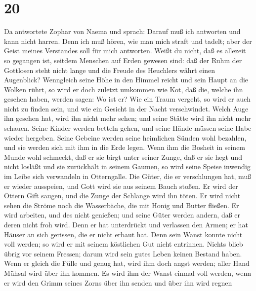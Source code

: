 \hypertarget{section-19}{%
\section{20}\label{section-19}}

 Da antwortete Zophar von Naema und sprach: 
Darauf muß ich antworten und kann nicht harren.  Denn ich
muß hören, wie man mich straft und tadelt; aber der Geist meines
Verstandes soll für mich antworten.  Weißt du nicht, daß es
allezeit so gegangen ist, seitdem Menschen auf Erden gewesen sind:
 daß der Ruhm der Gottlosen steht nicht lange und die Freude
des Heuchlers währt einen Augenblick?  Wenngleich seine Höhe
in den Himmel reicht und sein Haupt an die Wolken rührt,  so
wird er doch zuletzt umkommen wie Kot, daß die, welche ihn gesehen
haben, werden sagen: Wo ist er?  Wie ein Traum vergeht, so
wird er auch nicht zu finden sein, und wie ein Gesicht in der Nacht
verschwindet.  Welch Auge ihn gesehen hat, wird ihn nicht
mehr sehen; und seine Stätte wird ihn nicht mehr schauen. 
Seine Kinder werden betteln gehen, und seine Hände müssen seine Habe
wieder hergeben.  Seine Gebeine werden seine heimlichen
Sünden wohl bezahlen, und sie werden sich mit ihm in die Erde legen.
 Wenn ihm die Bosheit in seinem Munde wohl schmeckt, daß er
sie birgt unter seiner Zunge,  daß er sie hegt und nicht
losläßt und sie zurückhält in seinem Gaumen,  so wird seine
Speise inwendig im Leibe sich verwandeln in Otterngalle. 
Die Güter, die er verschlungen hat, muß er wieder ausspeien, und Gott
wird sie aus seinem Bauch stoßen.  Er wird der Ottern Gift
saugen, und die Zunge der Schlange wird ihn töten.  Er wird
nicht sehen die Ströme noch die Wasserbäche, die mit Honig und Butter
fließen.  Er wird arbeiten, und des nicht genießen; und
seine Güter werden andern, daß er deren nicht froh wird. 
Denn er hat unterdrückt und verlassen den Armen; er hat Häuser an sich
gerissen, die er nicht erbaut hat.  Denn sein Wanst konnte
nicht voll werden; so wird er mit seinem köstlichen Gut nicht entrinnen.
 Nichts blieb übrig vor seinem Fressen; darum wird sein
gutes Leben keinen Bestand haben.  Wenn er gleich die Fülle
und genug hat, wird ihm doch angst werden; aller Hand Mühsal wird über
ihn kommen.  Es wird ihm der Wanst einmal voll werden, wenn
er wird den Grimm seines Zorns über ihn senden und über ihn wird regnen
